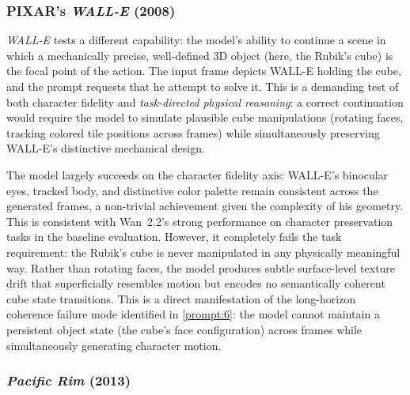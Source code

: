 \documentclass[sigconf]{acmart}
\begin{document}
\subsubsection*{PIXAR's \textit{WALL-E} (2008)}


\noindent \textit{WALL-E} tests a different capability: the model's
ability to continue a scene in which a mechanically precise,
well-defined 3D object (here, the Rubik's cube) is the focal point of
the action. The input frame depicts WALL-E holding the cube, and
the prompt requests that he attempt to solve it. This is a
demanding test of both character fidelity and \textit{task-directed
    physical reasoning}: a correct continuation would require the model
to simulate plausible cube manipulations (rotating faces, tracking
colored tile positions across frames) while simultaneously preserving
WALL-E's distinctive mechanical design.

The model largely succeeds on the character fidelity axis:
WALL-E's binocular eyes, tracked body, and distinctive color palette
remain consistent across the generated frames, a non-trivial
achievement given the complexity of his geometry. This is consistent
with Wan~2.2's strong performance on character preservation tasks
in the baseline evaluation. However, it completely fails the task
requirement: the Rubik's cube is never manipulated in any physically
meaningful way. Rather than rotating faces, the model produces
subtle surface-level texture drift that superficially resembles
motion but encodes no semantically coherent cube state transitions.
This is a direct manifestation of the long-horizon coherence failure
mode identified in \ref{prompt:6}: the model cannot maintain
a persistent object state (the cube's face configuration) across
frames while simultaneously generating character motion.

\subsubsection*{\textit{Pacific Rim} (2013)}

\end{document}
